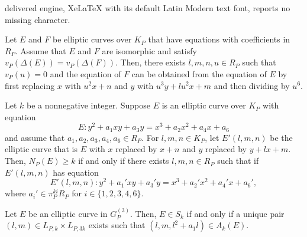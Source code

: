 \documentclass[10pt,a4paper]{amsart}
\begin{document}
delivered engine, XeLaTeX with its default Latin Modern text font, reports no missing character.
\begin{proposition}
\label{translation}
Let $E$ and $F$ be elliptic curves over $K_P$ that have equations with coefficients in $R_P$. Assume that $E$ and $F$ are isomorphic and satisfy $v_P(\Delta(E))=v_P(\Delta(F))$. Then, there exists $l,m,n,u\in R_P$ such that $v_P(u)=0$ and the equation of $F$ can be obtained from the equation of $E$ by first replacing $x$ with $u^2x+n$ and $y$ with $u^3y+lu^2x+m$ and then dividing by $u^6$.
\end{proposition}

\begin{proposition}
\label{prop:multiterations}
     Let $k$ be a nonnegative integer. Suppose $E$ is an elliptic curve over $K_P$ with equation
     \[
     E: y^2+a_1xy+a_3y=x^3+a_2x^2+a_4x+a_6
     \]
     and assume that $a_1,a_2,a_3,a_4,a_6\in R_P$. For $l,m,n\in K_P$, let $E'(l,m,n)$ be the elliptic curve that is $E$ with $x$ replaced by $x+n$ and $y$ replaced by $y+lx+m$. Then, $N_P(E)\geq k$ if and only if there exists $l,m,n\in R_P$ such that if $E'(l,m,n)$ has equation
     \[
     E'(l,m,n):y^2+a_1'xy+a_3'y=x^3+a_2'x^2+a_4'x+a_6',
     \]
     where $a_i'\in \pi_P^{ki}R_P$ for $i\in\{1,2,3,4,6\}$.
\end{proposition}

\begin{theorem}
\label{prop:unique2}
Let $E$ be an elliptic curve in $G_P^{(3)}$. Then, $E\in S_k$ if and only if a unique pair $(l,m)\in L_{P,k}\times L_{P,3k}$ exists such that $(l,m,l^2+a_1l)\in A_k(E)$.
\end{theorem}
\end{document}
